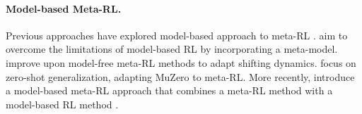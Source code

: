 \documentclass{article}
\begin{document}
\paragraph*{Model-based Meta-RL.}
Previous approaches have explored model-based approach to meta-RL \citep{GP, AdMRL, M3PO, densityEst}.
\citet{MB-MPO} aim to overcome the limitations of model-based RL \citep{MBPO} by incorporating a meta-model.
\citet{ReBAL} improve upon model-free meta-RL methods \citep{RL2, MAML} to adapt shifting dynamics.
\citet{ProcGenMuZero} focus on zero-shot generalization, adapting MuZero \citep{MuZero} to meta-RL.
More recently, \citet{MAMBA} introduce a model-based meta-RL approach that combines a meta-RL method \citep{VariBAD} with a model-based RL method \citep{DreamerV3}.
\end{document}
